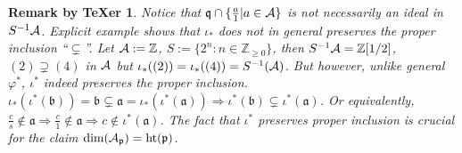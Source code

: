 \documentclass[11pt]{article}
\newtheorem{rmkt}[thm]{Remark by TeXer}
\newcommand{\intg}{\mathbb Z}
\newcommand{\sca}{{\mathfrak a}}
\newcommand{\scb}{{\mathfrak b}}
\newcommand{\scp}{{\mathfrak p}}
\newcommand{\scq}{\mathfrak q}
\newcommand{\cala}{{\cal A}}
\newcommand{\Lrta}{\Longrightarrow}
\begin{document}
\begin{rmkt}
  Notice that $\scq\cap\{\frac{a}{1}|a\in\cala\}$ is not necessarily an ideal in $S^{-1}\cala$. Explicit example shows that $\iota_*$ does not in general preserves the proper inclusion ``$\subsetneq$''. Let $\cala:=\intg$, $S:=\{2^n:n\in \intg_{\geq 0}\}$, then $S^{-1}\cala=\intg[1/2]$, $(2)\supsetneq (4)$ in $\cala$ but $\iota_*((2))=\iota_*((4))=S^{-1}(\cala)$. But however, unlike general $\varphi^*$, $\iota^*$ indeed preserves the proper inclusion. $\iota_*(\iota^*(\scb))=\scb\subsetneq \sca=\iota_*(\iota^*(\sca))\Lrta \iota^*(\scb)\subsetneq \iota^*(\sca)$. Or equivalently, $\frac{c}{s}\notin \sca\Lrta \frac{c}{1}\notin\sca\Lrta c\notin\iota^*(\sca)$. The fact that $\iota^*$ preserves proper inclusion is crucial for the claim $\text{dim}(\cala_\scp)=\text{ht}(\scp)$.
\end{rmkt}
\end{document}
